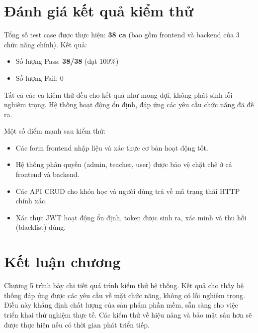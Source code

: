 \section{Đánh giá kết quả kiểm thử}
Tổng số test case được thực hiện: \textbf{38 ca} (bao gồm frontend và backend của 3 chức năng chính). Kết quả:
\begin{itemize}
    \item Số lượng Pass: \textbf{38/38} (đạt 100\%)
    \item Số lượng Fail: 0
\end{itemize}
Tất cả các ca kiểm thử đều cho kết quả như mong đợi, không phát sinh lỗi nghiêm trọng. Hệ thống hoạt động ổn định, đáp ứng các yêu cầu chức năng đã đề ra.

Một số điểm mạnh sau kiểm thử:
\begin{itemize}
    \item Các form frontend nhập liệu và xác thực cơ bản hoạt động tốt.
    \item Hệ thống phân quyền (admin, teacher, user) được bảo vệ chặt chẽ ở cả frontend và backend.
    \item Các API CRUD cho khóa học và người dùng trả về mã trạng thái HTTP chính xác.
    \item Xác thực JWT hoạt động ổn định, token được sinh ra, xác minh và thu hồi (blacklist) đúng.
\end{itemize}

\section{Kết luận chương}
Chương 5 trình bày chi tiết quá trình kiểm thử hệ thống. Kết quả cho thấy hệ thống đáp ứng được các yêu cầu về mặt chức năng, không có lỗi nghiêm trọng. Điều này khẳng định chất lượng của sản phẩm phần mềm, sẵn sàng cho việc triển khai thử nghiệm thực tế. Các kiểm thử về hiệu năng và bảo mật sâu hơn sẽ được thực hiện nếu có thời gian phát triển tiếp.
